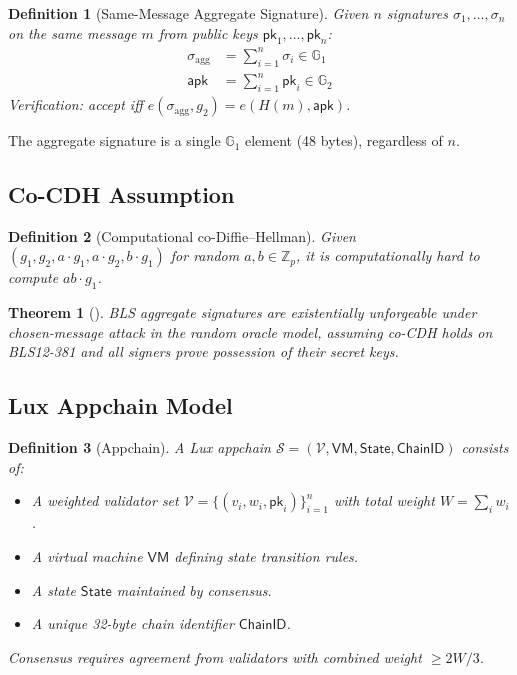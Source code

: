 \documentclass[11pt,a4paper]{article}
\newtheorem{theorem}{Theorem}
\newtheorem{definition}{Definition}
\begin{document}
\begin{definition}[Same-Message Aggregate Signature]
Given $n$ signatures $\sigma_1, \ldots, \sigma_n$ on the same message $m$ from public keys $\mathsf{pk}_1, \ldots, \mathsf{pk}_n$:
\begin{align}
    \sigma_{\text{agg}} &= \sum_{i=1}^{n} \sigma_i \in \mathbb{G}_1 \\
    \mathsf{apk} &= \sum_{i=1}^{n} \mathsf{pk}_i \in \mathbb{G}_2
\end{align}
Verification: accept iff $e(\sigma_{\text{agg}}, g_2) = e(H(m), \mathsf{apk})$.
\end{definition}

The aggregate signature is a single $\mathbb{G}_1$ element (48 bytes), regardless of $n$.

\subsection{Co-CDH Assumption}

\begin{definition}[Computational co-Diffie--Hellman]
Given $(g_1, g_2, a \cdot g_1, a \cdot g_2, b \cdot g_1)$ for random $a, b \in \mathbb{Z}_p$, it is computationally hard to compute $ab \cdot g_1$.
\end{definition}

\begin{theorem}[\cite{boneh2018compact}]
BLS aggregate signatures are existentially unforgeable under chosen-message attack in the random oracle model, assuming co-CDH holds on BLS12-381 and all signers prove possession of their secret keys.
\end{theorem}

\subsection{Lux Appchain Model}

\begin{definition}[Appchain]
A Lux appchain $\mathcal{S} = (\mathcal{V}, \mathsf{VM}, \mathsf{State}, \mathsf{ChainID})$ consists of:
\begin{itemize}
    \item A weighted validator set $\mathcal{V} = \{(v_i, w_i, \mathsf{pk}_i)\}_{i=1}^{n}$ with total weight $W = \sum_i w_i$.
    \item A virtual machine $\mathsf{VM}$ defining state transition rules.
    \item A state $\mathsf{State}$ maintained by consensus.
    \item A unique 32-byte chain identifier $\mathsf{ChainID}$.
\end{itemize}
Consensus requires agreement from validators with combined weight $\geq 2W/3$.
\end{definition}
\end{document}
